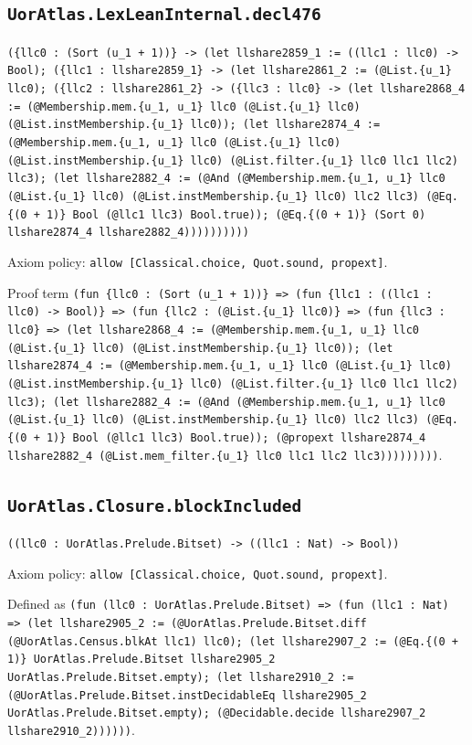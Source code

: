 \documentclass[11pt]{article}
\begin{document}
\subsection*{\texttt{UorAtlas.LexLeanInternal.decl476}}
\noindent\texttt{(\{llc0 : (Sort (u\_1 + 1))\} -> (let llshare2859\_1 := ((llc1 : llc0) -> Bool); (\{llc1 : llshare2859\_1\} -> (let llshare2861\_2 := (@List.\{u\_1\} llc0); (\{llc2 : llshare2861\_2\} -> (\{llc3 : llc0\} -> (let llshare2868\_4 := (@Membership.mem.\{u\_1, u\_1\} llc0 (@List.\{u\_1\} llc0) (@List.instMembership.\{u\_1\} llc0)); (let llshare2874\_4 := (@Membership.mem.\{u\_1, u\_1\} llc0 (@List.\{u\_1\} llc0) (@List.instMembership.\{u\_1\} llc0) (@List.filter.\{u\_1\} llc0 llc1 llc2) llc3); (let llshare2882\_4 := (@And (@Membership.mem.\{u\_1, u\_1\} llc0 (@List.\{u\_1\} llc0) (@List.instMembership.\{u\_1\} llc0) llc2 llc3) (@Eq.\{(0 + 1)\} Bool (@llc1 llc3) Bool.true)); (@Eq.\{(0 + 1)\} (Sort 0) llshare2874\_4 llshare2882\_4))))))))))}\par
\noindent Axiom policy: \texttt{allow [Classical.choice, Quot.sound, propext]}.\par
\noindent Proof term \texttt{(fun \{llc0 : (Sort (u\_1 + 1))\} => (fun \{llc1 : ((llc1 : llc0) -> Bool)\} => (fun \{llc2 : (@List.\{u\_1\} llc0)\} => (fun \{llc3 : llc0\} => (let llshare2868\_4 := (@Membership.mem.\{u\_1, u\_1\} llc0 (@List.\{u\_1\} llc0) (@List.instMembership.\{u\_1\} llc0)); (let llshare2874\_4 := (@Membership.mem.\{u\_1, u\_1\} llc0 (@List.\{u\_1\} llc0) (@List.instMembership.\{u\_1\} llc0) (@List.filter.\{u\_1\} llc0 llc1 llc2) llc3); (let llshare2882\_4 := (@And (@Membership.mem.\{u\_1, u\_1\} llc0 (@List.\{u\_1\} llc0) (@List.instMembership.\{u\_1\} llc0) llc2 llc3) (@Eq.\{(0 + 1)\} Bool (@llc1 llc3) Bool.true)); (@propext llshare2874\_4 llshare2882\_4 (@List.mem\_filter.\{u\_1\} llc0 llc1 llc2 llc3)))))))))}.\par
\subsection*{\texttt{UorAtlas.Closure.blockIncluded}}
\noindent\texttt{((llc0 : UorAtlas.Prelude.Bitset) -> ((llc1 : Nat) -> Bool))}\par
\noindent Axiom policy: \texttt{allow [Classical.choice, Quot.sound, propext]}.\par
\noindent Defined as \texttt{(fun (llc0 : UorAtlas.Prelude.Bitset) => (fun (llc1 : Nat) => (let llshare2905\_2 := (@UorAtlas.Prelude.Bitset.diff (@UorAtlas.Census.blkAt llc1) llc0); (let llshare2907\_2 := (@Eq.\{(0 + 1)\} UorAtlas.Prelude.Bitset llshare2905\_2 UorAtlas.Prelude.Bitset.empty); (let llshare2910\_2 := (@UorAtlas.Prelude.Bitset.instDecidableEq llshare2905\_2 UorAtlas.Prelude.Bitset.empty); (@Decidable.decide llshare2907\_2 llshare2910\_2))))))}.\par
\end{document}
